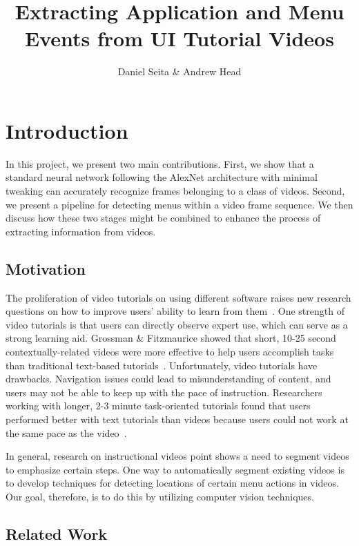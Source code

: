 \documentclass[10pt]{article}
\title{Extracting Application and Menu Events from UI Tutorial Videos}
\author{Daniel Seita \& Andrew Head}
\begin{document}
\maketitle

\section{Introduction}

In this project, we present two main contributions. First, we show that a standard neural network
following the AlexNet architecture with minimal tweaking can accurately recognize frames belonging
to a class of videos.  Second, we present a pipeline for detecting menus within a video frame
sequence. We then discuss how these two stages might be combined to enhance the process of
extracting information from videos.

\subsection{Motivation}

The proliferation of video tutorials on using different software raises new research questions on
how to improve users' ability to learn from them~\cite{matejka_ambient_2011,
pongnumkul_pause-and-play_2011}.  One strength of video tutorials is that users can directly observe
expert use, which can serve as a strong learning aid. Grossman \& Fitzmaurice showed that short,
10-25 second contextually-related videos were more effective to help users accomplish tasks than
traditional text-based tutorials~\cite{grossman_toolclips_2010}.  Unfortunately, video tutorials
have drawbacks. Navigation issues could lead to misunderstanding of content, and users may not be
able to keep up with the pace of instruction. Researchers working with longer, 2-3 minute
task-oriented tutorials found that users performed better with text tutorials than videos because
users could not work at the same pace as the video~\cite{grabler_generating_2009}.

In general, research on instructional videos point shows a need to segment videos to emphasize
certain steps. One way to automatically segment existing videos is to develop techniques for
detecting locations of certain menu actions in videos. Our goal, therefore, is to do this by
utilizing computer vision techniques.


\subsection{Related Work}
\end{document}
